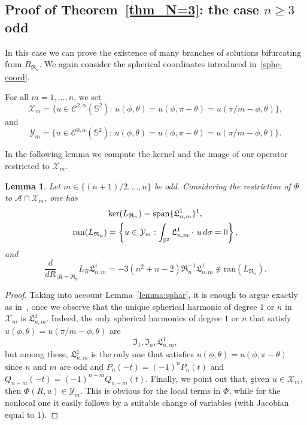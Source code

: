 \documentclass[10pt,reqno,english]{amsart}
\newcommand{\Sd}{\mathbb{S}^2}
\newcommand{\rn}{{\mathfrak R}_n  }
\newtheorem{lemma}{Lemma}[section]
\theoremstyle{definition}
\numberwithin{equation}{section}
\begin{document}
\subsection{Proof of Theorem\texorpdfstring{~\ref{thm_N=3}}{ 1}: the case \texorpdfstring{$n\ge3$}{n>=3} odd}


In this case we can prove the existence of many branches of solutions bifurcating from $B_{\rn}$. We again consider the spherical coordinates introduced in~\eqref{sphe-coord}.

For all $m=1,\dots,n$, we set
\[
\mathcal X_m=\{u\in\mathcal C^{2,\alpha}(\Sd):\,u(\phi,\theta)=u(\phi,\pi-\theta)=u(\pi/m-\phi,\theta)\},
\]
and
\[
\mathcal Y_m=\{u\in\mathcal C^{0,\alpha}(\Sd):\,u(\phi,\theta)=u(\phi,\pi-\theta)=u(\pi/m-\phi,\theta)\}.
\]

In the following lemma we compute the kernel and the image of our operator restricted to $\mathcal X_m$.


\begin{lemma}
\label{lemma:ker3d}
Let $m\in\{(n+1)/2,\dots,n\}$ be odd. Considering the restriction of $\Phi$ to $\mathcal A\cap\mathcal X_m$, one has
\begin{gather*}
\mathrm{ker}( L_{\rn})=\mathrm{span}\{\mathfrak L^1_{n,m}\}\footnotemark,\\
\mathrm{ran}(L_{\rn})=\left\{u\in\mathcal Y_m:\int_{\Sd}\mathfrak L^1_{n,m}\cdot\,u\,d\sigma=0\right\},
\end{gather*}
and
\[
\frac{d}{dR}_{|R=\rn}L_R\mathfrak L^1_{n,m}=-3(n^2+n-2)\rn^{-1}\mathfrak L^1_{n,m}\not\in\mathrm{ran}(L_{\rn}).
\]
\end{lemma}
\begin{proof}
Taking into account Lemma~\ref{lemma:sphar}, it is enough to argue exactly as in~\cite[Proposition 9]{Fr19}, once we observe that the unique spherical harmonic of degree $1$ or $n$ in $\mathcal X_m$ is $\mathfrak L^1_{n,m}$.
Indeed, the only spherical harmonics of degree $1$ or $n$ that satisfy $u(\phi,\theta)=u(\pi/m-\phi,\theta)$ are
\[
\mathfrak I_1,\mathfrak I_n,\mathfrak L^1_{n,m},
\]
but among these, $\mathfrak L^1_{n,m}$ is the only one that satisfies $u(\phi,\theta)=u(\phi,\pi-\theta)$ since $n$ and $m$ are odd and $P_n(-t)=(-1)^nP_n(t)$ and $Q_{n-m}(-t)=(-1)^{n-m}Q_{n-m}(t)$.
Finally, we point out that, given $u \in \mathcal X_m$, then $\Phi(R,u) \in \mathcal Y_m$. This is obvious for the local terms in $\Phi$, while for the nonlocal one it easily follows by a suitable change of variables (with Jacobian equal to $1$).
\end{proof}
\end{document}
